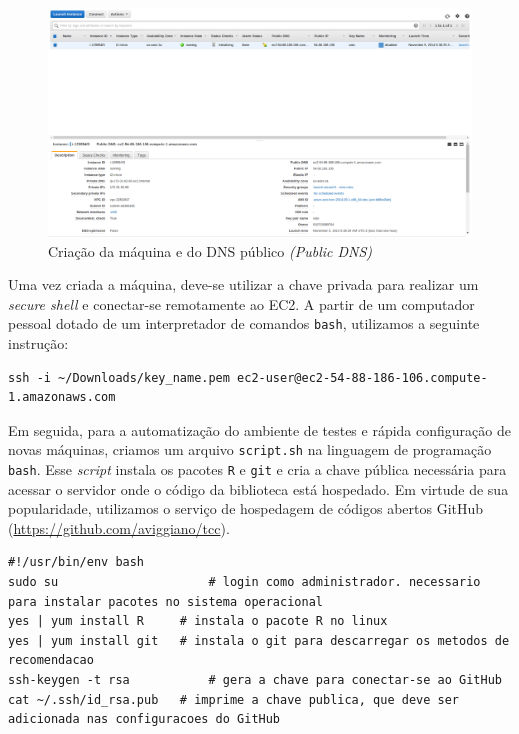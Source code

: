 \begin{figure}[htp]
    \begin{center}
    \includegraphics[width=1\textwidth]{img/aws_setup_dns}
    \end{center}
    \caption{Criação da máquina e do DNS público \textit{(Public DNS)}}
    \label{fig:aws_setup_dns}
\end{figure}



Uma vez criada a máquina, deve-se utilizar a chave privada para realizar um \textit{secure shell} e conectar-se remotamente ao EC2. A partir de um computador pessoal dotado de um interpretador de comandos \texttt{bash}, utilizamos a seguinte instrução:

\begin{lstlisting}
ssh -i ~/Downloads/key_name.pem ec2-user@ec2-54-88-186-106.compute-1.amazonaws.com
\end{lstlisting}

Em seguida, para a automatização do ambiente de testes e rápida configuração de novas máquinas, criamos um arquivo \texttt{script.sh} na linguagem de programação \texttt{bash}. Esse \textit{script} instala os pacotes \texttt{R} e \texttt{git} e cria a chave pública necessária para acessar o servidor onde o código da biblioteca está hospedado. Em virtude de sua popularidade, utilizamos o serviço de hospedagem de códigos abertos GitHub (\url{https://github.com/aviggiano/tcc}). 

\begin{lstlisting}
#!/usr/bin/env bash
sudo su						# login como administrador. necessario para instalar pacotes no sistema operacional
yes | yum install R		# instala o pacote R no linux
yes | yum install git	# instala o git para descarregar os metodos de recomendacao
ssh-keygen -t rsa			# gera a chave para conectar-se ao GitHub
cat ~/.ssh/id_rsa.pub	# imprime a chave publica, que deve ser adicionada nas configuracoes do GitHub
\end{lstlisting}

